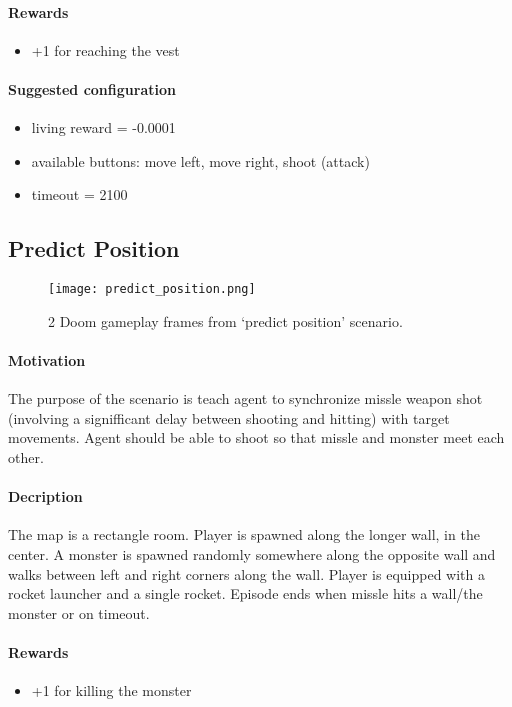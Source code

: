 		\paragraph{Rewards}

		\begin{itemize}
			\item +1 for reaching the vest
		\end{itemize}
		
		\paragraph{Suggested configuration}
		\begin{itemize}
			\item living reward = -0.0001
			\item available buttons: move left, move right, shoot (attack)
			\item timeout = 2100
		\end{itemize}
	\newpage

	\subsection{Predict Position}
		\begin{figure}
			\centering
			\texttt{[image: predict\_position.png]}
			\caption{2 Doom gameplay frames from `predict position' scenario.}\label{fig:predict_position}
		\end{figure}
		\paragraph{Motivation} 
			The purpose of the scenario is teach agent to synchronize missle weapon shot (involving a signifficant delay between shooting and hitting) with target movements. Agent should be able to shoot so that missle and monster meet each other.

		\paragraph{Decription}
			The map is a rectangle room. Player is spawned along the longer wall, in the center. A monster is spawned randomly somewhere along the opposite wall and walks between left and right corners along the wall. Player is equipped with a rocket launcher and a single rocket. Episode ends when missle hits a wall/the monster or on timeout.
		\paragraph{Rewards}
		\begin{itemize}
			\item +1 for killing the monster
		\end{itemize}
		
